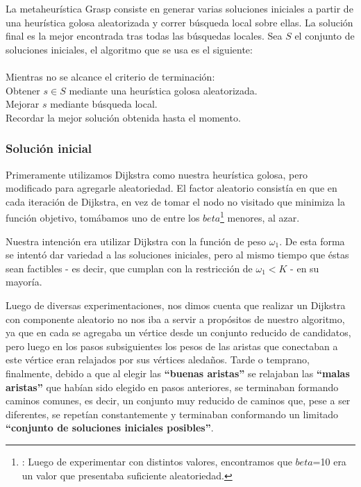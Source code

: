 La metaheurística Grasp consiste en generar varias soluciones iniciales a partir de una heurística golosa aleatorizada y correr búsqueda local sobre ellas. La solución final es la mejor encontrada tras todas las búsquedas locales.
Sea $S$ el conjunto de soluciones iniciales, el algoritmo que se usa es el siguiente:\\\\
\hspace*{1 cm} Mientras no se alcance el criterio de terminación:\\
\hspace*{2 cm} Obtener $s \in S$ mediante una heurística golosa aleatorizada.\\
\hspace*{2 cm} Mejorar $s$ mediante búsqueda local.\\
\hspace*{2 cm} Recordar la mejor solución obtenida hasta el momento.\\
\subsubsection{Solución inicial}

Primeramente utilizamos Dijkstra como nuestra heurística golosa, pero modificado para agregarle aleatoriedad. El factor aleatorio consistía en que en cada iteración de Dijkstra, en vez de tomar el nodo no visitado que minimiza la función objetivo, tomábamos uno de entre los $beta$\footnote{\label{$beta$}: Luego de experimentar con distintos valores, encontramos que $beta$=10 era un valor que presentaba suficiente aleatoriedad.} menores, al azar.

Nuestra intención era utilizar Dijkstra con la función de peso $\omega_1$. De esta forma se intentó dar variedad a las soluciones iniciales, pero al mismo tiempo que éstas sean factibles - es decir, que cumplan con la restricción de $\omega_1 < K$ - en su mayoría.

Luego de diversas experimentaciones, nos dimos cuenta que realizar un Dijkstra con componente aleatorio no nos iba a servir a propósitos de nuestro algoritmo, ya que en cada se agregaba un vértice desde un conjunto reducido de candidatos, pero luego en los pasos subsiguientes los pesos de las aristas que conectaban a este vértice eran relajados por sus vértices aledaños. Tarde o temprano, finalmente, debido a que al elegir las \textbf{``buenas aristas''} se relajaban las \textbf{``malas aristas''} que habían sido elegido en pasos anteriores, se terminaban formando caminos comunes, es decir, un conjunto muy reducido de caminos que, pese a ser diferentes, se repetían constantemente y terminaban conformando un limitado \textbf{``conjunto de soluciones iniciales posibles''}.

